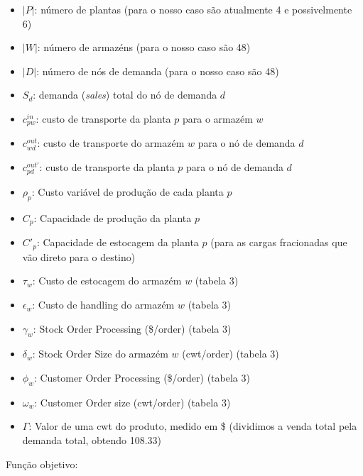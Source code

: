 \documentclass[12pt,a4paper]{article}
\begin{document}
\begin{itemize}
    \item $|P|$: número de plantas (para o nosso caso são atualmente 4 e possivelmente 6)
    \item $|W|$: número de armazéns (para o nosso caso são 48)
    \item $|D|$: número de nós de demanda (para o nosso caso são 48)
    \item $S_d$: demanda (\textit{sales}) total do nó de demanda $d$
    \item $c^{in}_{pw}$: custo de transporte da planta $p$ para o armazém $w$
    \item $c^{out}_{wd}$: custo de transporte do armazém $w$ para o nó de demanda $d$
    \item $c^{out'}_{pd}$: custo de transporte da planta $p$ para o nó de demanda $d$
    \item $\rho_{p}$: Custo variável de produção de cada planta $p$
    \item $C_{p}$: Capacidade de produção da planta $p$
    \item $C'_{p}$: Capacidade de estocagem da planta $p$ (para as cargas fracionadas que vão direto para o destino)
    \item $\tau_{w}$: Custo de estocagem do armazém $w$ (tabela 3)
    \item $\epsilon_{w}$: Custo de handling do armazém $w$ (tabela 3)
    \item $\gamma_{w}$: Stock Order Processing (\$/order) (tabela 3)
    \item $\delta_{w}$: Stock Order Size do armazém $w$ (cwt/order) (tabela 3)
    \item $\phi_{w}$: Customer Order Processing (\$/order) (tabela 3)
    \item $\omega_{w}$: Customer Order size (cwt/order) (tabela 3)
    \item $\Gamma$: Valor de uma cwt do produto, medido em \$ (dividimos a venda total pela demanda total, obtendo 108.33)
\end{itemize}

Função objetivo:

\end{document}
